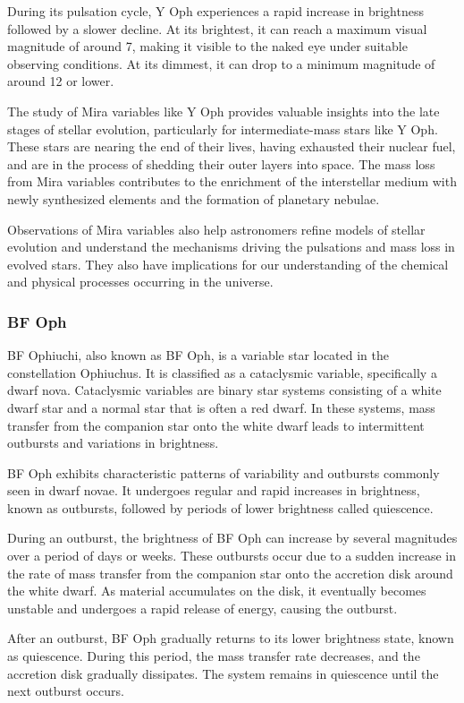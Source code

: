 During its pulsation cycle, Y Oph experiences a rapid increase in brightness followed by a slower decline. At its brightest, it can reach a maximum visual magnitude of around 7, making it visible to the naked eye under suitable observing conditions. At its dimmest, it can drop to a minimum magnitude of around 12 or lower.

The study of Mira variables like Y Oph provides valuable insights into the late stages of stellar evolution, particularly for intermediate-mass stars like Y Oph. These stars are nearing the end of their lives, having exhausted their nuclear fuel, and are in the process of shedding their outer layers into space. The mass loss from Mira variables contributes to the enrichment of the interstellar medium with newly synthesized elements and the formation of planetary nebulae.

Observations of Mira variables also help astronomers refine models of stellar evolution and understand the mechanisms driving the pulsations and mass loss in evolved stars. They also have implications for our understanding of the chemical and physical processes occurring in the universe.

\subsubsection*{ BF Oph }
BF Ophiuchi, also known as BF Oph, is a variable star located in the constellation Ophiuchus. It is classified as a cataclysmic variable, specifically a dwarf nova. Cataclysmic variables are binary star systems consisting of a white dwarf star and a normal star that is often a red dwarf. In these systems, mass transfer from the companion star onto the white dwarf leads to intermittent outbursts and variations in brightness.

BF Oph exhibits characteristic patterns of variability and outbursts commonly seen in dwarf novae. It undergoes regular and rapid increases in brightness, known as outbursts, followed by periods of lower brightness called quiescence.

During an outburst, the brightness of BF Oph can increase by several magnitudes over a period of days or weeks. These outbursts occur due to a sudden increase in the rate of mass transfer from the companion star onto the accretion disk around the white dwarf. As material accumulates on the disk, it eventually becomes unstable and undergoes a rapid release of energy, causing the outburst.

After an outburst, BF Oph gradually returns to its lower brightness state, known as quiescence. During this period, the mass transfer rate decreases, and the accretion disk gradually dissipates. The system remains in quiescence until the next outburst occurs.

